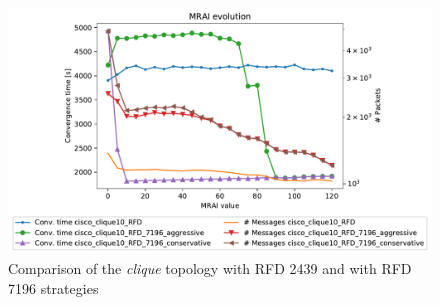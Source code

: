 \begin{figure}[h]
    \centering
    \includegraphics[width=\textwidth]{images/RFD/clique/cisco_clique10_RFD_comparison_constant_all.pdf}
	\caption{Comparison of the \textit{clique} topology with RFD 2439 and with
		RFD 7196 strategies}
    \label{fig:clique_RFD2439VSRFD7196}
\end{figure}
\clearpage


